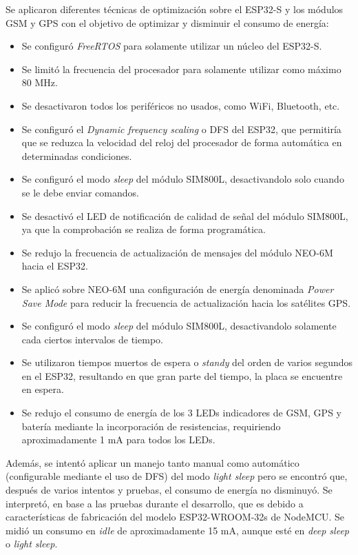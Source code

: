 Se aplicaron diferentes técnicas de optimización sobre el ESP32-S y los módulos GSM y GPS con el objetivo de optimizar y disminuir el consumo de energía:
\begin{itemize}
	\item Se configuró \textit{FreeRTOS} para solamente utilizar un núcleo del ESP32-S.
	\item Se limitó la frecuencia del procesador para solamente utilizar como máximo 80 MHz.
	\item Se desactivaron todos los periféricos no usados, como WiFi, Bluetooth, etc.
	\item Se configuró el \textit{Dynamic frequency scaling} o DFS del ESP32, que permitiría que se reduzca la velocidad del reloj del procesador de forma automática en determinadas condiciones\citep{ESP32:2}.
	\item Se configuró el modo \textit{sleep} del módulo SIM800L, desactivandolo solo cuando se le debe enviar comandos.
	\item Se desactivó el LED de notificación de calidad de señal del módulo SIM800L, ya que la comprobación se realiza de forma programática.
	\item Se redujo la frecuencia de actualización de mensajes del módulo NEO-6M hacia el ESP32.
	\item Se aplicó sobre NEO-6M una configuración de energía denominada \textit{Power Save Mode} para reducir la frecuencia de actualización hacia los satélites GPS\citep{NEO6M:2}.
	\item Se configuró el modo \textit{sleep} del módulo SIM800L, desactivandolo solamente cada ciertos intervalos de tiempo.
	\item Se utilizaron tiempos muertos de espera o \textit{standy} del orden de varios segundos en el ESP32, resultando en que gran parte del tiempo, la placa se encuentre en espera.
	\item Se redujo el consumo de energía de los 3 LEDs indicadores de GSM, GPS y batería mediante la incorporación de resistencias, requiriendo aproximadamente 1 mA para todos los LEDs.
\end{itemize}

Además, se intentó aplicar un manejo tanto manual como automático (configurable mediante el uso de DFS) del modo \textit{light sleep} pero se encontró que, después de varios intentos y pruebas, el consumo de energía no disminuyó. Se interpretó, en base a las pruebas durante el desarrollo, que es debido a características de fabricación del modelo ESP32-WROOM-32s de NodeMCU. Se midió un consumo en \textit{idle} de aproximadamente 15 mA, aunque esté en \textit{deep sleep} o \textit{light sleep}.

